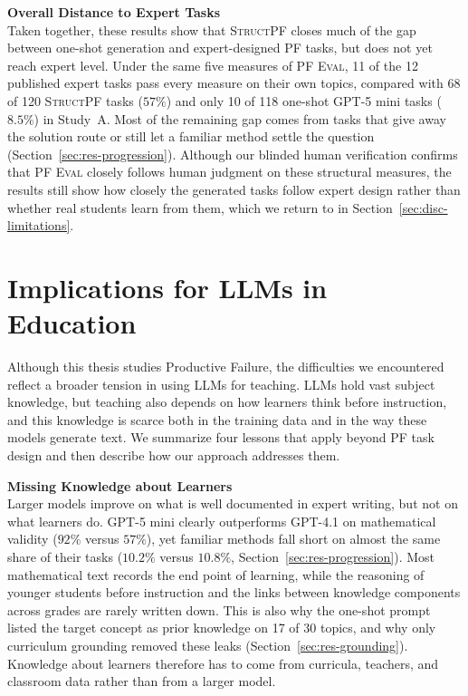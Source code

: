 \textbf{Overall Distance to Expert Tasks}\\[0.2em]
Taken together, these results show that \textsc{StructPF} closes much of the gap between one-shot generation and expert-designed PF tasks, but does not yet reach expert level. Under the same five measures of \textsc{PF Eval}, 11 of the 12 published expert tasks pass every measure on their own topics, compared with 68 of 120 \textsc{StructPF} tasks ($57\%$) and only 10 of 118 one-shot GPT-5 mini tasks ($8.5\%$) in Study~A. Most of the remaining gap comes from tasks that give away the solution route or still let a familiar method settle the question (Section~\ref{sec:res-progression}). Although our blinded human verification confirms that \textsc{PF Eval} closely follows human judgment on these structural measures, the results still show how closely the generated tasks follow expert design rather than whether real students learn from them, which we return to in Section~\ref{sec:disc-limitations}.

\section{Implications for LLMs in Education}
\label{sec:disc-findings}

Although this thesis studies Productive Failure, the difficulties we encountered reflect a broader tension in using LLMs for teaching. LLMs hold vast subject knowledge, but teaching also depends on how learners think before instruction, and this knowledge is scarce both in the training data and in the way these models generate text. We summarize four lessons that apply beyond PF task design and then describe how our approach addresses them.

\textbf{Missing Knowledge about Learners}\\[0.2em]
Larger models improve on what is well documented in expert writing, but not on what learners do. GPT-5 mini clearly outperforms GPT-4.1 on mathematical validity ($92\%$ versus $57\%$), yet familiar methods fall short on almost the same share of their tasks ($10.2\%$ versus $10.8\%$, Section~\ref{sec:res-progression}). Most mathematical text records the end point of learning, while the reasoning of younger students before instruction and the links between knowledge components across grades are rarely written down. This is also why the one-shot prompt listed the target concept as prior knowledge on 17 of 30 topics, and why only curriculum grounding removed these leaks (Section~\ref{sec:res-grounding}). Knowledge about learners therefore has to come from curricula, teachers, and classroom data rather than from a larger model.


